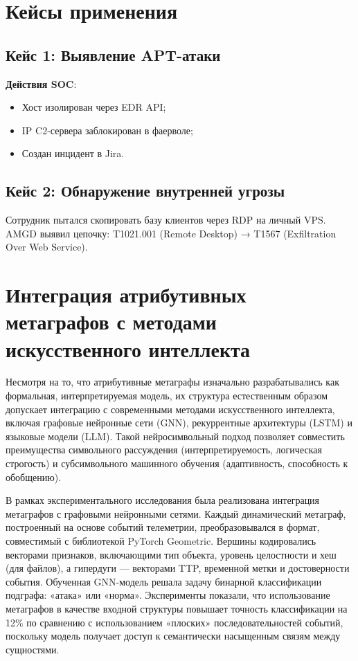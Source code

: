 \section{Кейсы применения}

\subsection{Кейс 1: Выявление APT-атаки}

\textbf{Действия SOC}:  
\begin{itemize}
    \item Хост изолирован через EDR API;
    \item IP C2-сервера заблокирован в фаерволе;
    \item Создан инцидент в Jira.
\end{itemize}
\subsection{Кейс 2: Обнаружение внутренней угрозы}

Сотрудник пытался скопировать базу клиентов через RDP на личный VPS.  
AMGD выявил цепочку:  
T1021.001 (Remote Desktop) → T1567 (Exfiltration Over Web Service).

\section{Интеграция атрибутивных метаграфов с методами искусственного интеллекта}

Несмотря на то, что атрибутивные метаграфы изначально разрабатывались как формальная, интерпретируемая модель, их структура естественным образом допускает интеграцию с современными методами искусственного интеллекта, включая графовые нейронные сети (GNN), рекуррентные архитектуры (LSTM) и языковые модели (LLM). Такой нейросимвольный подход позволяет совместить преимущества символьного рассуждения (интерпретируемость, логическая строгость) и субсимвольного машинного обучения (адаптивность, способность к обобщению).

В рамках экспериментального исследования была реализована интеграция метаграфов с графовыми нейронными сетями. Каждый динамический метаграф, построенный на основе событий телеметрии, преобразовывался в формат, совместимый с библиотекой PyTorch Geometric. Вершины кодировались векторами признаков, включающими тип объекта, уровень целостности и хеш (для файлов), а гипердуги — векторами TTP, временной метки и достоверности события. Обученная GNN-модель решала задачу бинарной классификации подграфа: «атака» или «норма». Эксперименты показали, что использование метаграфов в качестве входной структуры повышает точность классификации на 12\% по сравнению с использованием «плоских» последовательностей событий, поскольку модель получает доступ к семантически насыщенным связям между сущностями.

